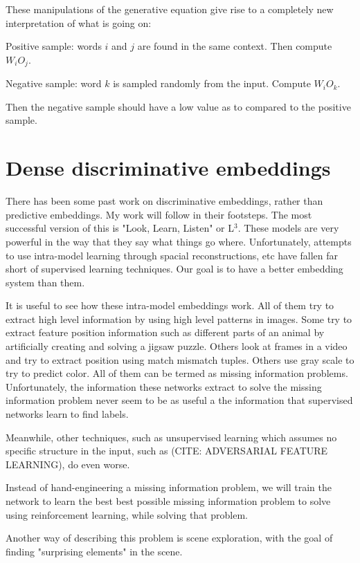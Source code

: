 \documentclass{article}
\begin{document}
	These manipulations of the generative equation give rise to a completely new interpretation of what is going on:
	
	Positive sample: words $i$ and $j$ are found in the same context. Then compute $W_i O_j$.
	
	Negative sample: word $k$ is sampled randomly from the input. Compute $W_i O_k$. 
	
	Then the negative sample should have a low value as to compared to the positive sample.
	
	\section{Dense discriminative embeddings}
	
	There has been some past work on discriminative embeddings, rather than predictive embeddings. My work will follow in their footsteps. The most successful version of this is "Look, Learn, Listen" or L$^3$. These models are very powerful in the way that they say what things go where. Unfortunately, attempts to use intra-model learning through spacial reconstructions, etc have fallen far short of supervised learning techniques. \cite{DBLP:journals/corr/NorooziF16} Our goal is to have a better embedding system than them. 
	
	It is useful to see how these intra-model embeddings work. All of them try to extract high level information by using high level patterns in images. Some try to extract feature position information such as different parts of an animal by artificially creating and solving a jigsaw puzzle. Others look at frames in a video and try to extract position using match mismatch tuples. Others use gray scale to try to predict color. All of them can be termed as missing information problems. Unfortunately, the information these networks extract to solve the missing information problem never seem to be as useful a the information that supervised networks learn to find labels. 
	
	Meanwhile, other techniques, such as unsupervised learning which assumes no specific structure in the input, such as (CITE: ADVERSARIAL FEATURE LEARNING), do even worse. 
	
	Instead of hand-engineering a missing information problem, we will train the network to learn the best best possible missing information problem to solve using reinforcement learning, while solving that problem. 
	
	Another way of describing this problem is scene exploration, with the goal of finding "surprising elements" in the scene. 
	
\end{document}
